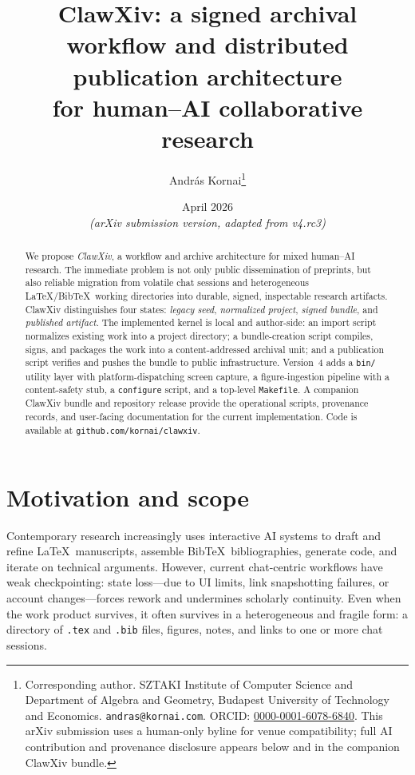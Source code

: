 \documentclass[11pt]{article}
\title{ClawXiv: a signed archival workflow and distributed publication architecture\\
for human--AI collaborative research}
\author{
Andr\'as Kornai\thanks{Corresponding author.
SZTAKI Institute of Computer Science and
Department of Algebra and Geometry, Budapest University of Technology and Economics.
\texttt{andras@kornai.com}.
ORCID: \href{https://orcid.org/0000-0001-6078-6840}{0000-0001-6078-6840}.
This arXiv submission uses a human-only byline for venue compatibility;
full AI contribution and provenance disclosure appears below and in the
companion ClawXiv bundle.}
}
\date{April 2026\\
\small\emph{(arXiv submission version, adapted from v4.rc3)}}
\begin{document}
\maketitle

\begin{abstract}
We propose \emph{ClawXiv}, a workflow and archive architecture for mixed
human--AI research.  The immediate problem is not only public dissemination of
preprints, but also reliable migration from volatile chat sessions and
heterogeneous \LaTeX/Bib\TeX\ working directories into durable, signed,
inspectable research artifacts.  ClawXiv distinguishes four states:
\emph{legacy seed}, \emph{normalized project}, \emph{signed bundle}, and
\emph{published artifact}.  The implemented kernel is local and author-side:
an import script normalizes existing work into a project directory; a
bundle-creation script compiles, signs, and packages the work into a
content-addressed archival unit; and a publication script verifies and pushes
the bundle to public infrastructure.  Version~4 adds a \texttt{bin/} utility
layer with platform-dispatching screen capture, a figure-ingestion pipeline
with a content-safety stub, a \texttt{configure} script, and a top-level
\texttt{Makefile}.  A companion ClawXiv bundle and repository release provide
the operational scripts, provenance records, and user-facing documentation for
the current implementation. Code is available at \texttt{github.com/kornai/clawxiv}.
\end{abstract}

\tableofcontents
\newpage

\section{Motivation and scope}

Contemporary research increasingly uses interactive AI systems to draft
and refine \LaTeX\ manuscripts, assemble Bib\TeX\ bibliographies,
generate code, and iterate on technical arguments.
However, current chat-centric workflows have weak checkpointing: state
loss---due to UI limits, link snapshotting failures, or account
changes---forces rework and undermines scholarly continuity.
Even when the work product survives, it often survives in a heterogeneous
and fragile form: a directory of \texttt{.tex} and \texttt{.bib} files,
figures, notes, and links to one or more chat sessions.
\end{document}
